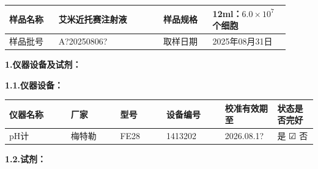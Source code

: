 \documentclass[UTF8,10pt,a4paper,fontset=fandol]{ctexart}
\newcommand{\fieldvalue}[1]{#1}
\newcommand{\handwritten}[1]{#1}
\newcommand{\checkboxfield}[1]{\ifstrequal{#1}{checked}{☑}{\ifstrequal{#1}{unclear}{?}{☐}}}
\begin{document}
\begin{tabular}{|p{0.16\linewidth}|p{0.34\linewidth}|p{0.16\linewidth}|p{0.25\linewidth}|}
\hline
样品名称 &
\fieldvalue{艾米近托赛注射液} &
样品规格 &
\fieldvalue{12ml：$6.0\times10^{7}$个细胞}
\\ \hline
样品批号 &
\fieldvalue{\handwritten{A?20250806?}} &
取样日期 &
\fieldvalue{\handwritten{2025年08月31日}}
\\ \hline
\end{tabular}

\bigskip

\textbf{1.\quad 仪器设备及试剂：}

\textbf{1.1.\quad 仪器设备：}

\begin{tabular}{|p{0.20\linewidth}|p{0.16\linewidth}|p{0.15\linewidth}|p{0.19\linewidth}|p{0.17\linewidth}|p{0.13\linewidth}|}
\hline
仪器名称 & 厂家 & 型号 & 设备编号 & 校准有效期至 & 状态是否完好 \\
\hline
\fieldvalue{pH计} &
\fieldvalue{梅特勒} &
\fieldvalue{FE28} &
\fieldvalue{1413202} &
\fieldvalue{\handwritten{2026.08.1?}} &
是
\fieldvalue{\checkboxfield{checked}} \quad 否
\\ \hline
\end{tabular}

\textbf{1.2.\quad 试剂：}
\end{document}
